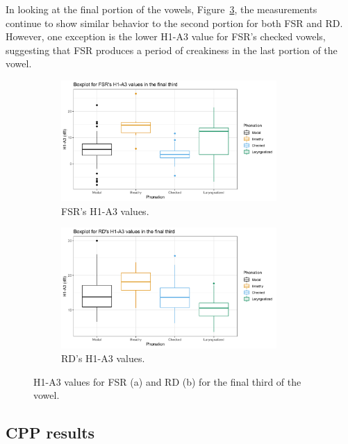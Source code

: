 \documentclass[12pt, letterpaper]{article}
\begin{document}
In looking at the final portion of the vowels, Figure~\ref{fig:h1a3third}, the measurements continue to show similar behavior to the second portion for both FSR and RD. However, one exception is the lower H1-A3 value for FSR's checked vowels, suggesting that FSR produces a period of creakiness in the last portion of the vowel.

\begin{figure}[!ht]
	\centering
	\begin{subfigure}{.5\textwidth}
		\centering
		\includegraphics[width=0.9\textwidth]{Images/mean_FSR_h1a3_third.png}
		\caption{FSR's H1-A3 values.}
		\label{fig:FSRh1a3third} 
	\end{subfigure}%
	\begin{subfigure}{.5\textwidth}
		\centering
		\includegraphics[width=0.9\textwidth]{Images/mean_RD_h1a3_third.png}
		\caption{RD's H1-A3 values.}
		\label{fig:RDh1a3third} 
	\end{subfigure}
	\caption{H1-A3 values for FSR (a) and RD (b) for the final third of the vowel. }
	\label{fig:h1a3third}
\end{figure}

\subsection{CPP results} \label{sec:CPP}
\end{document}
